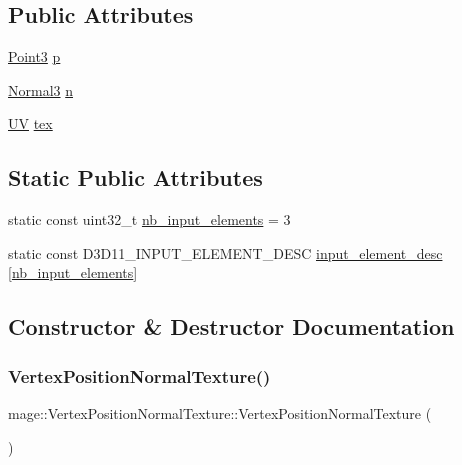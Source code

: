 \subsection*{Public Attributes}
\begin{DoxyCompactItemize}
\item 
\hyperlink{structmage_1_1_point3}{Point3} \hyperlink{structmage_1_1_vertex_position_normal_texture_a9000b80274027dd7b7d258f45523ca65}{p}
\item 
\hyperlink{structmage_1_1_normal3}{Normal3} \hyperlink{structmage_1_1_vertex_position_normal_texture_a442eb1609ab596e3e33c26f7be32695a}{n}
\item 
\hyperlink{structmage_1_1_u_v}{UV} \hyperlink{structmage_1_1_vertex_position_normal_texture_a0782e41c5e28d421bfb47afad9af9c55}{tex}
\end{DoxyCompactItemize}
\subsection*{Static Public Attributes}
\begin{DoxyCompactItemize}
\item 
static const uint32\+\_\+t \hyperlink{structmage_1_1_vertex_position_normal_texture_ae4e7cf708af3f123450ec65a68e21584}{nb\+\_\+input\+\_\+elements} = 3
\item 
static const D3\+D11\+\_\+\+I\+N\+P\+U\+T\+\_\+\+E\+L\+E\+M\+E\+N\+T\+\_\+\+D\+E\+SC \hyperlink{structmage_1_1_vertex_position_normal_texture_a4e6f650ee5968c6dc873e8e41dae5395}{input\+\_\+element\+\_\+desc} \mbox{[}\hyperlink{structmage_1_1_vertex_position_normal_texture_ae4e7cf708af3f123450ec65a68e21584}{nb\+\_\+input\+\_\+elements}\mbox{]}
\end{DoxyCompactItemize}


\subsection{Constructor \& Destructor Documentation}
\hypertarget{structmage_1_1_vertex_position_normal_texture_a05158b4e9daf54137a2b8fba80890034}{}\label{structmage_1_1_vertex_position_normal_texture_a05158b4e9daf54137a2b8fba80890034} 
\subsubsection{\texorpdfstring{Vertex\+Position\+Normal\+Texture()}{VertexPositionNormalTexture()}\hspace{0.1cm}{\footnotesize\ttfamily [1/4]}}
{\footnotesize\ttfamily mage\+::\+Vertex\+Position\+Normal\+Texture\+::\+Vertex\+Position\+Normal\+Texture (\begin{DoxyParamCaption}{ }\end{DoxyParamCaption})\hspace{0.3cm}{\ttfamily [default]}}

